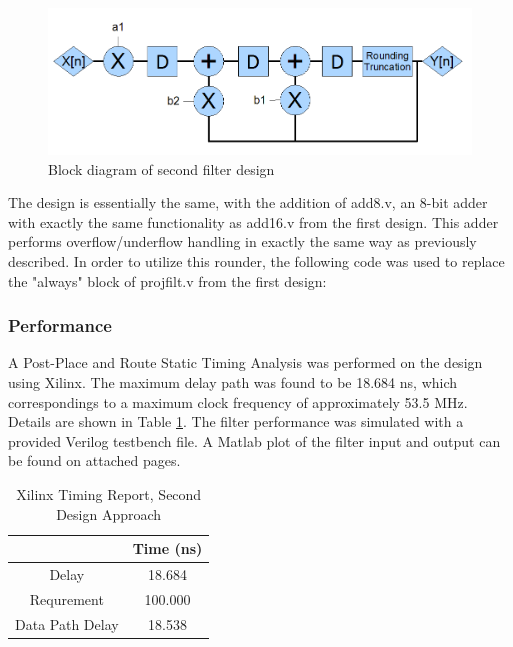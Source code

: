 \begin{figure}[h]
\begin{center}
\includegraphics[scale=0.5]{block_two.png}
\end{center}
\caption{Block diagram of second filter design}
\label{fig:block2}
\end{figure}


The design is essentially the same, with the addition of add8.v, an 8-bit adder with exactly the same functionality as add16.v from the first design. This adder performs overflow/underflow handling in exactly the same way as previously described. In order to utilize this rounder, the following code was used to replace the "always" block of projfilt.v from the first design:





\subsubsection*{Performance}
A Post-Place and Route Static Timing Analysis was performed on the design using Xilinx. The maximum delay path was found to be 18.684 ns, which correspondings to a maximum clock frequency of approximately 53.5 MHz. Details are shown in Table \ref{tab:timing2}. The filter performance was simulated with a provided Verilog testbench file. A Matlab plot of the filter input and output can be found on attached pages.

\begin{table}[h]
\begin{center}
\caption{Xilinx Timing Report, Second Design Approach}
\begin{tabular}{c|c}
           & Time (ns) \\
\hline
     Delay &     18.684 \\

Requrement &        100.000 \\

Data Path Delay &     18.538 \\
\end{tabular}  
\end{center}
\label{tab:timing2}
\end{table}


